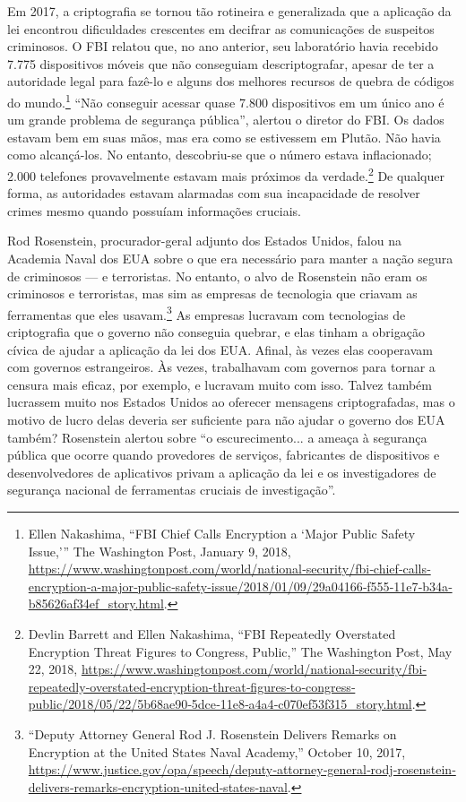 \documentclass{book}
\begin{document}
Em 2017, a criptografia se tornou tão rotineira e generalizada que a aplicação da lei encontrou dificuldades crescentes em decifrar as comunicações de suspeitos criminosos. O FBI relatou que, no ano anterior, seu laboratório havia recebido 7.775 dispositivos móveis que não conseguiam descriptografar, apesar de ter a autoridade legal para fazê-lo e alguns dos melhores recursos de quebra de códigos do mundo.\footnote{Ellen Nakashima, “FBI Chief Calls Encryption a ‘Major Public Safety Issue,’” The Washington Post, January 9, 2018, \url{ https://www.washingtonpost.com/world/national‐security/fbi‐chief‐calls‐encryption‐a-major‐public‐safety‐issue/2018/01/09/29a04166‐f555‐11e7‐b34a‐b85626af34ef_story.html}.} ``Não conseguir acessar quase 7.800 dispositivos em um único ano é um grande problema de segurança pública'', alertou o diretor do FBI. Os dados estavam bem em suas mãos, mas era como se estivessem em Plutão. Não havia como alcançá-los. No entanto, descobriu-se que o número estava inflacionado; 2.000 telefones provavelmente estavam mais próximos da verdade.\footnote{Devlin Barrett and Ellen Nakashima, “FBI Repeatedly Overstated Encryption Threat Figures to Congress, Public,” The Washington Post, May 22, 2018, \url{https://www.washingtonpost.com/world/national‐security/fbi‐repeatedly‐overstated‐encryption-threat‐figures‐to‐congress‐public/2018/05/22/5b68ae90‐5dce‐11e8‐a4a4‐c070ef53f315_story.html}.} De qualquer forma, as autoridades estavam alarmadas com sua incapacidade de resolver crimes mesmo quando possuíam informações cruciais.

Rod Rosenstein, procurador-geral adjunto dos Estados Unidos, falou na Academia Naval dos EUA sobre o que era necessário para manter a nação segura de criminosos --- e terroristas. No entanto, o alvo de Rosenstein não eram os criminosos e terroristas, mas sim as empresas de tecnologia que criavam as ferramentas que eles usavam.\footnote{“Deputy Attorney General Rod J. Rosenstein Delivers Remarks on Encryption at the United States Naval Academy,” October 10, 2017, \url{https://www.justice.gov/opa/speech/deputy‐attorney‐general‐rodj‐rosenstein‐delivers‐remarks‐encryption‐united‐states‐naval}.} As empresas lucravam com tecnologias de criptografia que o governo não conseguia quebrar, e elas tinham a obrigação cívica de ajudar a aplicação da lei dos EUA. Afinal, às vezes elas cooperavam com governos estrangeiros. Às vezes, trabalhavam com governos para tornar a censura mais eficaz, por exemplo, e lucravam muito com isso. Talvez também lucrassem muito nos Estados Unidos ao oferecer mensagens criptografadas, mas o motivo de lucro delas deveria ser suficiente para não ajudar o governo dos EUA também? Rosenstein alertou sobre ``o escurecimento... a ameaça à segurança pública que ocorre quando provedores de serviços, fabricantes de dispositivos e desenvolvedores de aplicativos privam a aplicação da lei e os investigadores de segurança nacional de ferramentas cruciais de investigação''.
\end{document}
